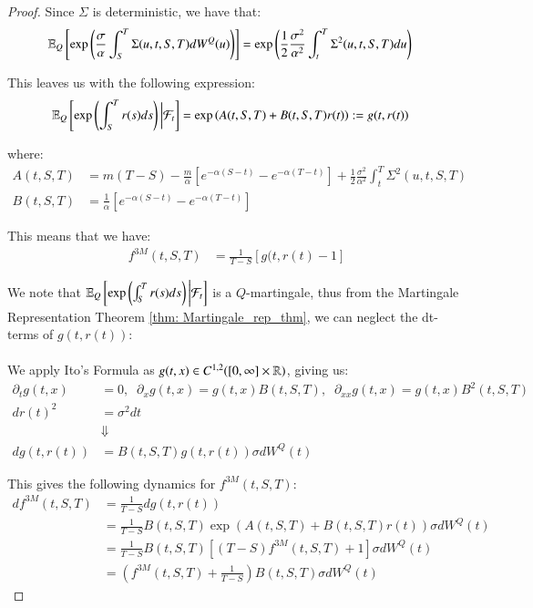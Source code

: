 \begin{proof}
Since $\Sigma$ is deterministic, we have that: 
\begin{align*}
\mathbb{E}_{Q}\left[
\exp\left(
\frac{\sigma}{\alpha}\int_{S}^{T}\Sigma(u,t,S,T)dW^{Q}(u)
\right)
\right]
&= 
\exp\left(
\frac{1}{2}\frac{\sigma^{2}}{\alpha^{2}}\int_{t}^{T}\Sigma^{2}(u,t,S,T)du
\right)
\end{align*}

This leaves us with the following expression:
\begin{align*}
 \mathbb{E}_{Q}\left[
\exp\left(
\int_{S}^{T}r(s)ds
\right)\bigg{|}\mathcal{F}_{t}
\right] 
&= 
\exp\left(
A(t,S,T) + B(t,S,T)r(t)
\right):= g(t,r(t))
\end{align*}

where: 
\begin{align*}
A(t,S,T) &= m(T-S) - \frac{m}{\alpha}\left[
e^{-\alpha(S-t)} - e^{-\alpha(T-t)}
\right] + \frac{1}{2}\frac{\sigma^{2}}{\alpha^{2}}\int_{t}^{T}\Sigma^{2}(u,t,S,T) \\
B(t,S,T) &= \frac{1}{\alpha}\left[
e^{-\alpha(S-t)} - e^{-\alpha(T-t)}
\right]
\end{align*}

This means that we have: 
\begin{align*}
f^{3M}(t,S,T) &= \frac{1}{T-S}\left[
g(t,r(t) - 1
\right]    
\end{align*}

We note that $\mathbb{E}_{Q}\left[
\exp\left(
\int_{S}^{T}r(s)ds
\right)\bigg{|}\mathcal{F}_{t}
\right]$ is a $Q$-martingale, thus from the Martingale Representation Theorem \ref{thm: Martingale_rep_thm}, we can neglect the dt-terms of $g(t,r(t))$:
\\~\\
We apply Ito's Formula as $g(t,x) \in C^{1,2}([0,\infty]\times \mathbb{R})$, giving us: 
\begin{align*}
\partial_{t}g(t,x) &= 0, \;\; \partial_{x}g(t,x) = g(t,x)B(t,S,T), \;\; 
\partial_{xx}g(t,x) = g(t,x)B^{2}(t,S,T) \\ 
dr(t)^{2} &= \sigma^{2}dt \\ 
&\Downarrow \\ 
dg(t,r(t)) &= B(t,S,T)g(t,r(t))\sigma dW^{Q}(t)
\end{align*}

\newpage 

This gives the following dynamics for $f^{3M}(t,S,T)$:
\begin{align*}
df^{3M}(t,S,T) &= \frac{1}{T-S}dg(t,r(t)) \\ 
&= \frac{1}{T-S}B(t,S,T)\exp\left(A(t,S,T) + B(t,S,T)r(t)\right)\sigma dW^{Q}(t)\\ 
&= 
\frac{1}{T-S}B(t,S,T)\left[
(T-S)f^{3M}(t,S,T) +1
\right]\sigma dW^{Q}(t) \\ 
&= 
\left(
f^{3M}(t,S,T) + \frac{1}{T-S}
\right)B(t,S,T)\sigma dW^{Q}(t)
\end{align*}



\end{proof}



